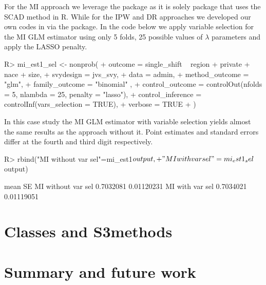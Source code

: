 \documentclass[
]{jss}
\begin{document}
For the MI approach we leverage the  package \citep{ncvreg}
as it is solely package that uses the SCAD method in R. While for the
IPW and DR approaches we developed our own codes in  via
the  package. In the code below we apply variable selection
for the MI GLM estimator using only 5 folds, 25 possible values of
\(\lambda\) parameters and apply the LASSO penalty.

\begin{CodeChunk}
\begin{CodeInput}
R> mi_est1_sel <- nonprob(
+   outcome = single_shift ~ region + private + nace + size,
+   svydesign = jvs_svy,
+   data = admin,
+   method_outcome = "glm",
+   family_outcome = "binomial" ,
+   control_outcome = controlOut(nfolds = 5, nlambda = 25, penalty = "lasso"),
+   control_inference = controlInf(vars_selection = TRUE),
+   verbose = TRUE
+ )
\end{CodeInput}
\end{CodeChunk}

In this case study the MI GLM estimator with variable selection yields
almost the same results as the approach without it. Point estimates and
standard errors differ at the fourth and third digit respectively.

\begin{CodeChunk}
\begin{CodeInput}
R> rbind("MI without var sel"=mi_est1$output,
+       "MI with var sel"=mi_est1_sel$output)
\end{CodeInput}
\begin{CodeOutput}
                        mean         SE
MI without var sel 0.7032081 0.01120231
MI with var sel    0.7034021 0.01119051
\end{CodeOutput}
\end{CodeChunk}

\section{Classes and S3methods}\label{sec-s3methods}

\section{Summary and future work}\label{summary-and-future-work}
\end{document}
